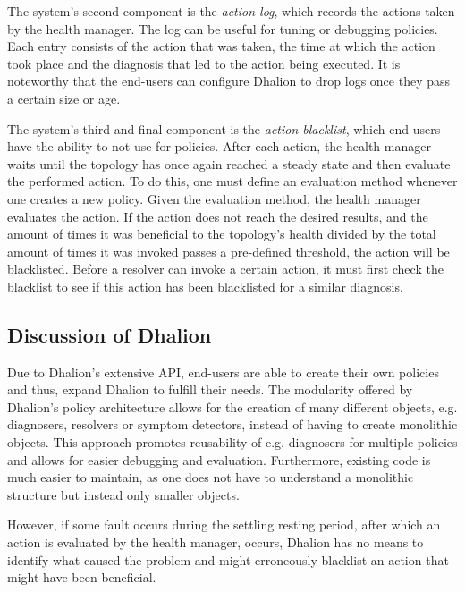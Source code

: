         \quad The system's second component is the \textit{action log}, which records the actions taken by the health manager.
        The log can be useful for tuning or debugging policies. Each entry consists of the action that was taken, the time at which the action took place and the diagnosis 
        that led to the action being executed. 
        It is noteworthy that the end-users can configure Dhalion to drop logs once they pass a certain size or age.

        \quad The system's third and final component is the \textit{action blacklist}, which end-users have the ability to not use for policies.
        After each action, the health manager waits until the topology has once again reached a steady state and then evaluate the performed action.
        To do this, one must define an evaluation method whenever one creates a new policy. Given the evaluation method, the health manager evaluates the action.
        If the action does not reach the desired results, and the amount of times it was beneficial to the topology's health divided by the total amount of times it 
        was invoked passes a pre-defined threshold, the action will be blacklisted.
        Before a resolver can invoke a certain action, it must first check the blacklist to see if this action has been blacklisted for a similar diagnosis.

        \subsection{Discussion of Dhalion}
        \label{sub:dhalion-discussion}
        Due to Dhalion's extensive API, end-users are able to create their own policies and thus, expand Dhalion to fulfill their needs. 
        The modularity offered by Dhalion's policy architecture allows for the creation of many different objects, e.g. diagnosers, resolvers or symptom detectors, 
        instead of having to create monolithic objects.
        This approach promotes reusability of e.g. diagnosers for multiple policies and allows for easier debugging and evaluation.
        Furthermore, existing code is much easier to maintain, as one does not have to understand a monolithic structure but instead only smaller objects.
        
        \quad However, if some fault occurs during the settling resting period, after which an action is evaluated by the health manager, occurs, Dhalion has no means to 
        identify what caused the problem and might erroneously blacklist an action that might have been beneficial.

